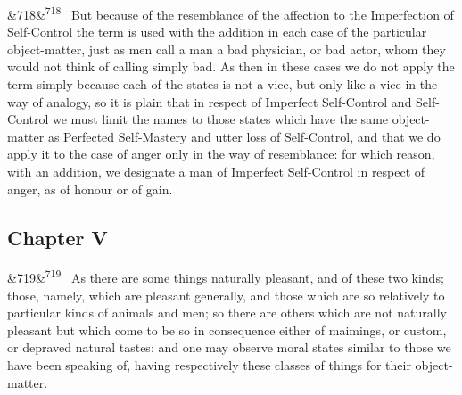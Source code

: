 \documentclass[12pt]{article}
\newcommand{\para}[1][]{\par\noindent\ifx&#1&\else\textsuperscript{\footnotesize #1}~\fi}
\begin{document}
\para[718] But because of the resemblance of the affection to the Imperfection of Self-Control the term is used with the addition in each case of the particular object-matter, just as men call a man a bad physician, or bad actor, whom they would not think of calling simply bad. As then in these cases we do not apply the term simply because each of the states is not a vice, but only like a vice in the way of analogy, so it is plain that in respect of Imperfect Self-Control and Self-Control we must limit the names to those states which have the same object-matter as Perfected Self-Mastery and utter loss of Self-Control, and that we do apply it to the case of anger only in the way of resemblance: for which reason, with an addition, we designate a man of Imperfect Self-Control in respect of anger, as of honour or of gain.

\subsection*{Chapter V}

\para[719] As there are some things naturally pleasant, and of these two kinds; those, namely, which are pleasant generally, and those which are so relatively to particular kinds of animals and men; so there are others which are not naturally pleasant but which come to be so in consequence either of maimings, or custom, or depraved natural tastes: and one may observe moral states similar to those we have been speaking of, having respectively these classes of things for their object-matter.
\end{document}
